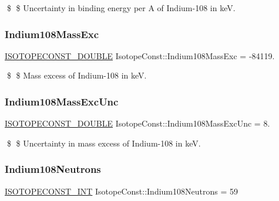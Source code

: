 \$ \$ Uncertainty in binding energy per A of Indium-\/108 in keV. \mbox{\label{group___isotope_const-_indium-_in108_gaada979f8f3d008eef46f0f3e8337961c}} 
\subsubsection{\texorpdfstring{Indium108\+Mass\+Exc}{Indium108MassExc}}
{\footnotesize\ttfamily \mbox{\hyperlink{group___isotope_const-_macros_ga8f45a7272ce02c0b4c65c44636ed719a}{I\+S\+O\+T\+O\+P\+E\+C\+O\+N\+S\+T\+\_\+\+D\+O\+U\+B\+LE}} Isotope\+Const\+::\+Indium108\+Mass\+Exc = -\/84119.}

\$ \$ Mass excess of Indium-\/108 in keV. \mbox{\label{group___isotope_const-_indium-_in108_ga971d59d882a912bfadc05a2c278ce50d}} 
\subsubsection{\texorpdfstring{Indium108\+Mass\+Exc\+Unc}{Indium108MassExcUnc}}
{\footnotesize\ttfamily \mbox{\hyperlink{group___isotope_const-_macros_ga8f45a7272ce02c0b4c65c44636ed719a}{I\+S\+O\+T\+O\+P\+E\+C\+O\+N\+S\+T\+\_\+\+D\+O\+U\+B\+LE}} Isotope\+Const\+::\+Indium108\+Mass\+Exc\+Unc = 8.}

\$ \$ Uncertainty in mass excess of Indium-\/108 in keV. \mbox{\label{group___isotope_const-_indium-_in108_ga9cdebc94fcaac56b9bc00c0afaffdd4a}} 
\subsubsection{\texorpdfstring{Indium108\+Neutrons}{Indium108Neutrons}}
{\footnotesize\ttfamily \mbox{\hyperlink{group___isotope_const-_macros_ga5f18360b3e99483a35c32d789e62621c}{I\+S\+O\+T\+O\+P\+E\+C\+O\+N\+S\+T\+\_\+\+I\+NT}} Isotope\+Const\+::\+Indium108\+Neutrons = 59}

